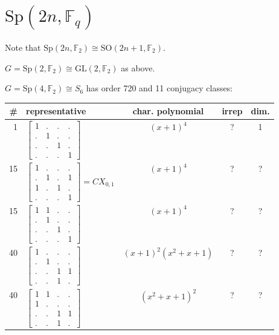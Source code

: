 \documentclass[11pt,oneside]{article}
\newcommand{\GL}{\mathrm{GL}}
\newcommand{\SO}{\mathrm{SO}}
\newcommand{\Sp}{\mathrm{Sp}}
\newcommand{\Field}{\mathbb{F}}
\begin{document}
\section{$\Sp(2n,\Field_q)$}

% 

Note that $\Sp(2n,\Field_2) \cong \SO(2n+1,\Field_2)$.

$G=\Sp(2,\Field_2)\cong \GL(2,\Field_2)$ as above.

$G=\Sp(4,\Field_2)\cong S_6$ has order 720 and 11 conjugacy classes:
\begin{center}
\begin{tabular}{r|l|c|c|c}
\# & representative & char. polynomial & irrep & dim. \\
\hline
1  & $\begin{bmatrix}1&.&.&.\\.&1&.&.\\.&.&1&.\\.&.&.&1\end{bmatrix}$  & $(x+1)^4$  & ? & 1  \\
15  & $\begin{bmatrix}1&.&.&.\\.&1&.&1\\1&.&1&.\\.&.&.&1\end{bmatrix}=CX_{0,1}$
    & $(x+1)^4$  & ? & ?  \\
15  & $\begin{bmatrix}1&1&.&.\\.&1&.&.\\.&.&1&.\\.&.&.&1\end{bmatrix}$  & $(x+1)^4$  & ? & ?  \\
40  &  $\begin{bmatrix}1&.&.&.\\.&1&.&.\\.&.&1&1\\.&.&1&.\end{bmatrix}$   & $(x+1)^2(x^2+x+1)$  & ? & ?  \\
40  & $\begin{bmatrix}1&1&.&.\\1&.&.&.\\.&.&1&1\\.&.&1&.\end{bmatrix}$    & $(x^2+x+1)^2$  & ? & ?  \\

\end{tabular}
\end{center}
\end{document}
